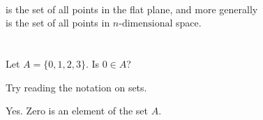 \begin{example}
  \begin{itemize}
    \leavevmode
    \ii{\(\RR \cap \ZZ = \ZZ\)}
      \\is the set of all points in the flat plane, and more generally
      \\is the set of all points in \(n\text{-dimensional}\) space.
\end{itemize}
\end{example}

\section{\problemhead}
\begin{problem}
  Let \(A=\{0,1,2,3\}\). Is \(0 \in A\)?
  \begin{hint}
    Try reading the notation on sets.
  \end{hint}
  \begin{sol}
    Yes. Zero is an element of the set \(A\).
  \end{sol}
\end{problem}
